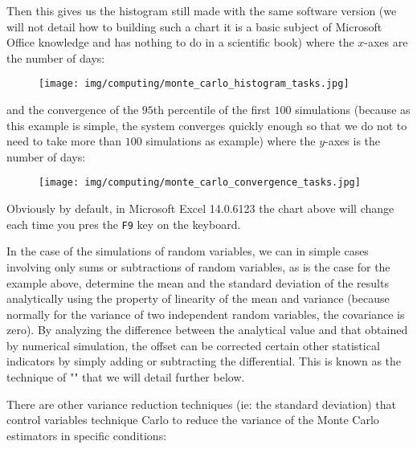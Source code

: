 	Then this gives us the histogram still made with the same software version (we will not detail how to building such a chart it is a basic subject of Microsoft Office knowledge and has nothing to do in a scientific book) where the $x$-axes are the number of days:
	\begin{figure}[H]
		\centering
		\texttt{[image: img/computing/monte\_carlo\_histogram\_tasks.jpg]}
	\end{figure}
	and the convergence of the $95$th percentile of the first $100$ simulations (because as this example is simple, the system converges quickly enough so that we do not to need to take more than $100$ simulations as example) where the $y$-axes is the number of days:
	\begin{figure}[H]
		\centering
		\texttt{[image: img/computing/monte\_carlo\_convergence\_tasks.jpg]}
	\end{figure}
	Obviously by default, in Microsoft Excel 14.0.6123 the chart above will change each time you pres the \texttt{F9} key on the keyboard.
	\begin{tcolorbox}[title=Remark,colframe=black,arc=10pt]
	In the case of the simulations of random variables, we can in simple cases involving only sums or subtractions of random variables, as is the case for the example above, determine the mean and the standard deviation of the results analytically using the property of linearity of the mean and variance (because normally for the variance of two independent random variables, the covariance is zero). By analyzing the difference between the analytical value and that obtained by numerical simulation, the offset can be corrected certain other statistical indicators by simply adding or subtracting the differential. This is known as the technique of "" that we will detail further below.
	\end{tcolorbox}
	There are other variance reduction techniques (ie: the standard deviation) that control variables technique Carlo to reduce the variance of the Monte Carlo estimators in specific conditions:

